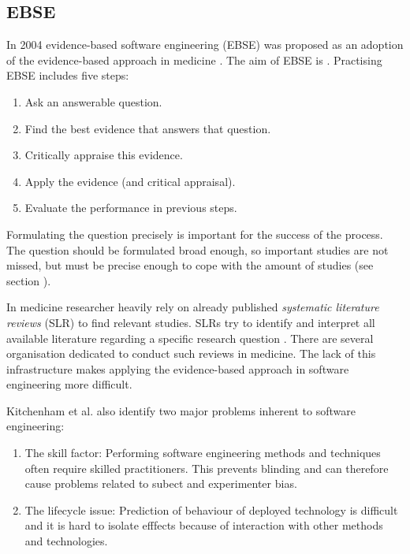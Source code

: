 \subsection{EBSE}

\newline
In 2004 evidence-based software engineering (EBSE) was proposed as an adoption of the evidence-based approach in medicine \cite{EBSE}. The aim of EBSE is  \cite{Dyba2005}. Practising EBSE includes five steps:
\begin{enumerate}
	\item Ask an answerable question.
	\item Find the best evidence that answers that question.
	\item Critically appraise this evidence.
	\item Apply the evidence (and critical appraisal).
	\item Evaluate the performance in previous steps.
\end{enumerate}
Formulating the question precisely is important for the success of the process. The question should be formulated broad enough, so important studies are not missed, but must be precise enough to cope with the amount of studies (see section ).

In medicine researcher heavily rely on already published \emph{systematic literature reviews} (SLR) to find relevant studies. SLRs try to identify and interpret all available literature regarding a specific research question \cite{keele2007}. There are several organisation dedicated to conduct such reviews in medicine. The lack of this infrastructure makes applying the evidence-based approach in software engineering more difficult.

Kitchenham et al. \cite{EBSE} also identify two major problems inherent to software engineering:
\begin{enumerate}
\item The skill factor: Performing software engineering methods and techniques often require skilled practitioners. This prevents blinding and can therefore cause problems related to subect and experimenter bias.
\item The lifecycle issue: Prediction of behaviour  of deployed technology is difficult and it is hard to isolate efffects because of interaction with other methods and technologies.
\end{enumerate}

